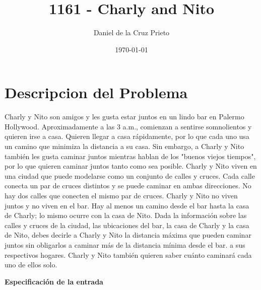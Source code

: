 \documentclass{article}
\begin{document}
    \title{1161 - Charly and Nito} 
    \author{Daniel de la Cruz Prieto} 
    \date{\today} 
    \maketitle

    \section*{Descripcion del Problema } 

    \begin{flushleft}
    Charly y Nito son amigos y les gusta estar juntos en un lindo bar en 
    Palermo Hollywood. Aproximadamente a las 3 a.m., comienzan a
    sentirse somnolientos y quieren irse a casa.
    Quieren llegar a casa r\'apidamente, por lo que cada uno usa 
    un camino que minimiza la distancia a su casa. Sin embargo,
    a Charly y Nito también les gusta caminar juntos mientras 
    hablan de los "buenos viejos tiempos", por lo que quieren 
    caminar juntos tanto como sea posible. Charly y Nito viven 
    en una ciudad que puede modelarse como un conjunto de 
    calles y cruces. Cada calle conecta un par de cruces 
    distintos y se puede caminar en ambas direcciones. 
    No hay dos calles que conecten el mismo par de cruces. 
    Charly y Nito no viven juntos y no viven en el bar. 
    Hay al menos un camino desde el bar hasta la casa de Charly; 
    lo mismo ocurre con la casa de Nito. 
    Dada la información sobre las calles y cruces de la ciudad, 
    las ubicaciones del bar, la casa de Charly y la casa de Nito,
    debes decirle a Charly y Nito la distancia m\'axima que pueden 
    caminar juntos sin obligarlos a caminar m\'as de la 
    distancia m\'inima desde el bar. a sus respectivos hogares.
    Charly y Nito tambi\'en quieren saber cu\'anto caminar\'a 
    cada uno de ellos solo.
    \end{flushleft}

    \begin{flushleft}
        {\bf Especificaci\'on de la entrada }
    \end{flushleft}
    
\end{document}
